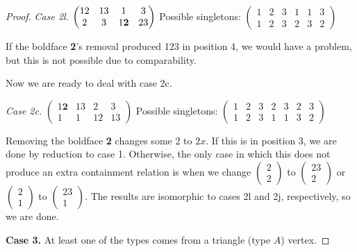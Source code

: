 \documentclass[11pt]{amsart}
\begin{document}
\begin{proof}
\textit{Case 2l.}
$\begin{pmatrix}
12 & 13 & 1 & 3\\
2 & 3 & 1{\bf 2} & 23 
\end{pmatrix}$
Possible singletons: 
$\begin{pmatrix}
1 & 2 & 3 & 1 & 1 & 3\\
1 & 2 & 3 & 2 & 3 & 2
\end{pmatrix}$

If the boldface {\bf 2}'s removal produced 123 in position 4, we would have a problem, but this is not possible due to comparability.


Now we are ready to deal with case 2c.

\textit{Case 2c.}
$\begin{pmatrix}
1\textbf{2} & 13 & 2 & 3\\
1 & 1 & 12 & 13 
\end{pmatrix}$
Possible singletons: 
$\begin{pmatrix}
1 & 2 & 3 & 2 & 3 & 2 & 3\\
1 & 2 & 3 & 1 & 1 & 3 & 2
\end{pmatrix}$

Removing the boldface {\bf 2} changes some 2 to $2x$. If this is in position 3, we are done by reduction to case 1. Otherwise, the only case in which this does not produce 
an extra containment relation is when we change 
$\begin{pmatrix} 2\\2\end{pmatrix}$ to
$\begin{pmatrix} 23\\2\end{pmatrix}$ or
$\begin{pmatrix} 2\\1\end{pmatrix}$ to
$\begin{pmatrix} 23\\1\end{pmatrix}$. The results are isomorphic to cases 2l and 2j, respectively, so we are done.

\smallskip

\textbf{Case 3.} At least one of the types comes from a triangle (type $A$) vertex.


\end{proof}
\end{document}
